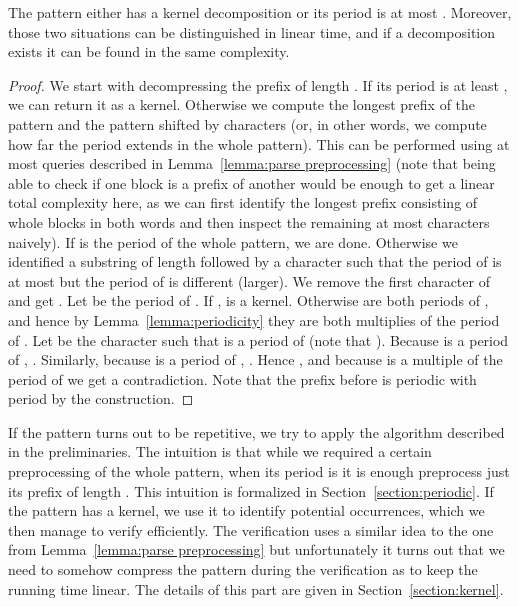\documentclass[runningheads]{llncs}
\begin{document}
\begin{lemma}
\label{lemma:kernel}
The pattern either has a kernel decomposition or its period is at most . Moreover, those two situations can be distinguished in linear time, and if a decomposition exists it can be found in the same complexity.
\end{lemma}

\begin{proof}
We start with decompressing the prefix of length . If its period  is at least , we can return it as a kernel. Otherwise we
compute the longest prefix of the pattern and the pattern shifted by  characters (or, in other words, we compute how far the period extends
in the whole pattern). This can be performed using at most  queries described in Lemma~\ref{lemma:parse preprocessing} (note that being able to check if one block is a prefix of another would be enough to get a linear total complexity here, as we can first identify the longest prefix consisting of whole blocks in both words and then inspect the remaining at most  characters naively). If  is the period
of the whole pattern, we are done. Otherwise we identified a substring  of length  followed by a character  such that the period of
 is at most  but the period of  is different (larger). We remove the first character of  and get . Let  be
the period of . If ,  is a kernel. Otherwise  are both periods of , and hence by 
Lemma~\ref{lemma:periodicity} they are both multiplies of the period of . Let  be the character such that  is a period of  (note that ). Because  is a period of , . Similarly, because  is a period of , . Hence , and because  is a multiple of the period of  we get a contradiction. Note that the prefix before  is periodic with period  by the construction.
\end{proof}

If the pattern turns out to be repetitive, we try to apply the algorithm described in the preliminaries. The intuition is that while we required a certain preprocessing of the whole pattern, when its period is  it is enough preprocess just its prefix of length . This intuition is formalized in Section~\ref{section:periodic}. If the pattern has a kernel, we use it to identify  potential occurrences, which we then manage to verify efficiently. The verification uses a similar idea to the one from Lemma~\ref{lemma:parse preprocessing} but unfortunately it turns out
that we need to somehow compress the pattern during the verification as to keep the running time linear. The details of this part are given in Section~\ref{section:kernel}.
\end{document}
